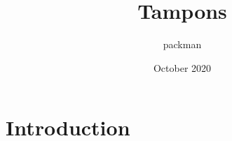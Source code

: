 \documentclass{article}
\title{Tampons}
\author{packman }
\date{October 2020}
\begin{document}
\maketitle

\section{Introduction}

\tlpstamp{}

\iscstamp{}
\end{document}
